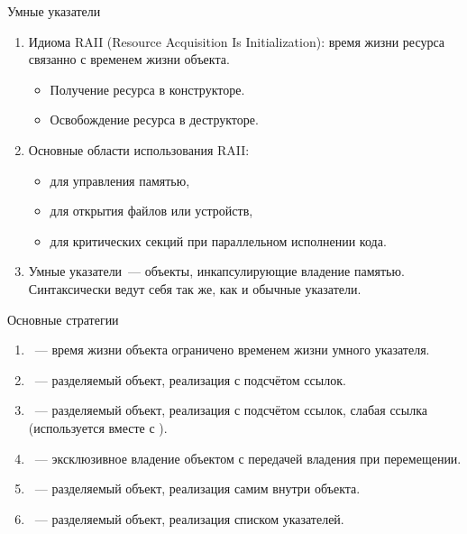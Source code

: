 \documentclass{beamer}
\begin{document}
\begin{frame}[fragile]{Умные указатели}
    \begin{enumerate}
        \item Идиома RAII (Resource Acquisition Is Initialization):
            время жизни ресурса связанно с временем жизни объекта.
            \begin{itemize}
                \item Получение ресурса в конструкторе.
                \item Освобождение ресурса в деструкторе.
            \end{itemize}

        \item Основные области использования RAII:
            \begin{itemize}
                \item для управления памятью,
                \item для открытия файлов или устройств,
                \item для критических секций при параллельном исполнении кода.
            \end{itemize}
        \item Умные указатели~--- объекты, инкапсулирующие владение памятью.
            Синтаксически ведут себя так же, как и обычные указатели.
    \end{enumerate}
\end{frame}

\begin{frame}[fragile]{Основные стратегии}
    \begin{enumerate}
        \item {}~--- время жизни объекта ограничено временем
            жизни умного указателя.
        \item {}~--- разделяемый объект, реализация с подсчётом
            ссылок.
        \item {}~--- разделяемый объект, реализация с подсчётом
            ссылок, слабая ссылка (используется вместе с ).
        \item {}~--- эксклюзивное владение
            объектом с передачей владения при перемещении. 
        \item {}~--- разделяемый объект, реализация самим
            внутри объекта.
        \item {}~--- разделяемый объект, реализация списком
            указателей.
    \end{enumerate}
\end{frame}
\end{document}
